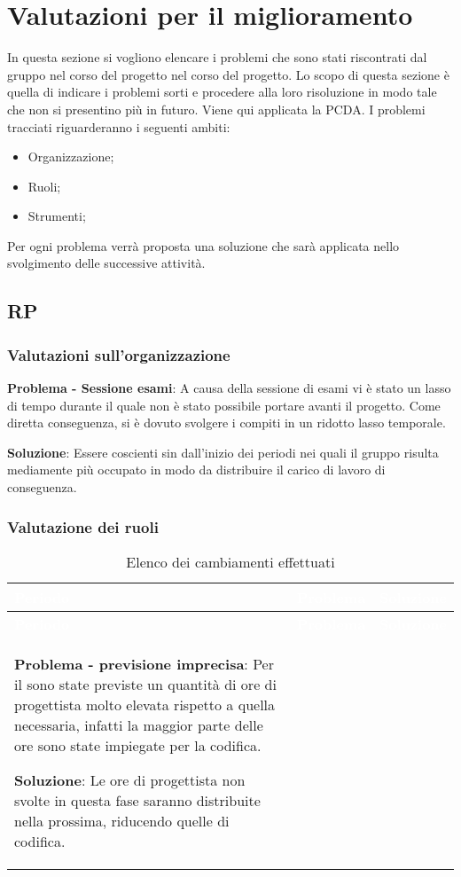 \section{Valutazioni per il miglioramento}
In questa sezione si vogliono elencare i problemi che sono stati riscontrati dal gruppo nel corso del progetto nel corso del progetto. Lo scopo di questa sezione è quella di indicare i problemi sorti e procedere alla loro risoluzione in modo tale che non si presentino più in futuro. Viene qui applicata la PCDA.
I problemi tracciati riguarderanno i seguenti ambiti:
\begin{itemize}
\item Organizzazione;
\item Ruoli;
\item Strumenti;
\end{itemize}
Per ogni problema verrà proposta una soluzione che sarà applicata nello svolgimento delle successive attività.

\subsection{RP}
\subsubsection{Valutazioni sull'organizzazione}
\textbf{Problema - Sessione esami}: A causa della sessione di esami vi è stato un lasso di tempo durante il quale non è stato possibile portare avanti il progetto. Come diretta conseguenza, si è dovuto svolgere i compiti in un ridotto lasso temporale.

\textbf{Soluzione}: Essere coscienti sin dall'inizio dei periodi nei quali il gruppo risulta mediamente più occupato in modo da distribuire il carico di lavoro di conseguenza. 

\subsubsection{Valutazione dei ruoli}

{
	\renewcommand{\arraystretch}{1.5}
	\centering
	\begin{longtable}{ C{2cm} C{6cm} C{6cm}}
		\caption{Elenco dei cambiamenti effettuati}\\
		\textcolor{white}{\textbf{Periodo}} & \textcolor{white}{\textbf{Problema}} & \textcolor{white}{\textbf{Soluzione}}\\
		\endfirsthead
		\textcolor{white}{\textbf{Periodo}} & \textcolor{white}{\textbf{Problema}} & \textcolor{white}{\textbf{Soluzione}}\\
		\endhead

\textbf{Problema - previsione imprecisa}: Per il  sono state previste un quantità di ore di progettista molto elevata rispetto a quella necessaria, infatti la maggior parte delle ore sono state impiegate per la codifica.

\textbf{Soluzione}: Le ore di progettista non svolte in questa fase saranno distribuite nella prossima, riducendo quelle di codifica.
	\end{longtable}
}

